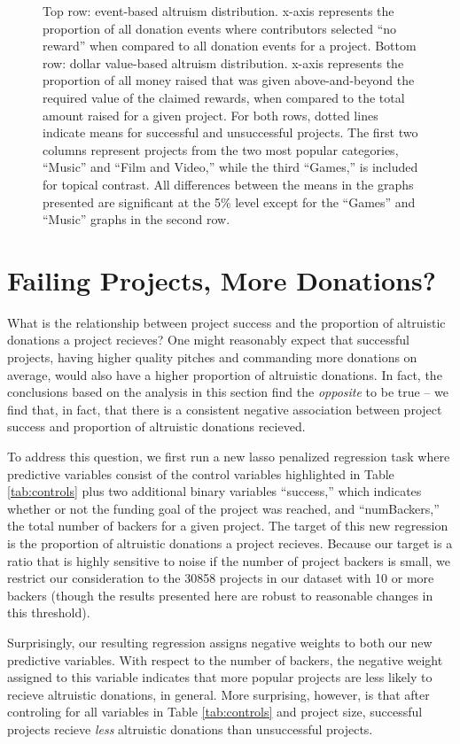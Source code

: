 \documentclass[letterpaper]{article}
\begin{document}
\begin{figure}[t]
{}
\caption{Top row: event-based altruism distribution. x-axis represents the proportion of all donation events where contributors selected ``no reward'' when compared to all donation events for a project. Bottom row: dollar value-based altruism distribution. x-axis represents the proportion of all money raised that was given above-and-beyond the required value of the claimed rewards, when compared to the total amount raised for a given project. For both rows, dotted lines indicate means for successful and unsuccessful projects. The first two columns represent projects from the two most popular categories, ``Music'' and ``Film and Video,'' while the third ``Games,'' is included for topical contrast. All differences between the means in the graphs presented are significant at the 5\% level except for the ``Games'' and ``Music'' graphs in the second row.}
\label{fig:failsucc}
\end{figure}
\section{Failing Projects, More Donations?}
What is the relationship between project success and the proportion of altruistic donations a project recieves? One might reasonably expect that successful projects, having higher quality pitches and commanding more donations on average, would also have a higher proportion of altruistic donations. In fact, the conclusions based on the analysis in this section find the \emph{opposite} to be true -- we find that, in fact, that there is a consistent negative association between project success and proportion of altruistic donations recieved.

To address this question, we first run a new lasso penalized regression task where predictive variables consist of the control variables highlighted in Table \ref{tab:controls} plus two additional binary variables ``success,'' which indicates whether or not the funding goal of the project was reached, and ``numBackers,'' the total number of backers for a given project. The target of this new regression is the proportion of altruistic donations a project recieves. Because our target is a ratio that is highly sensitive to noise if the number of project backers is small, we restrict our consideration to the 30858 projects in our dataset with 10 or more backers (though the results presented here are robust to reasonable changes in this threshold).

Surprisingly, our resulting regression assigns negative weights to both our new predictive variables. With respect to the number of backers, the negative weight assigned to this variable indicates that more popular projects are less likely to recieve altruistic donations, in general. More surprising, however, is that after controling for all variables in Table \ref{tab:controls} and project size, successful projects recieve \emph{less} altruistic donations than unsuccessful projects.
\end{document}
